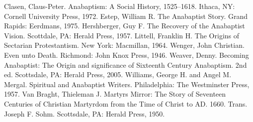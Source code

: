 \begin{readinglist}
\entry Clasen, Claus-Peter. Anabaptism: A Social History, 1525–1618. Ithaca, NY: Cornell University
  Press, 1972.
\entry Estep, William R. The Anabaptist Story. Grand Rapids: Eerdmans, 1975.
\entry Hershberger, Guy F. The Recovery of the Anabaptist Vision. Scottdale, PA: Herald Press, 1957.
\entry Littell, Franklin H. The Origins of Sectarian Protestantism. New York: Macmillan, 1964.
\entry Wenger, John Christian. Even unto Death. Richmond: John Knox Press, 1946.
\entry *Weaver, Denny. Becoming Anabaptist: The Origin and significance of Sixteenth Century
  Anabaptism. 2nd ed. Scottsdale, PA: Herald Press, 2005.
\entry Williams, George H. and Angel M. Mergal. Spiritual and Anabaptist Writers. Philadelphia: The
  Westminster Press, 1957.
\entry *Van Braght, Thieleman J. Martyrs Mirror: The Story of Seventeen Centuries of Christian
  Martyrdom from the Time of Christ to AD. 1660. Trans. Joseph F. Sohm. Scottsdale, PA: Herald
  Press, 1950.
\end{readinglist}
